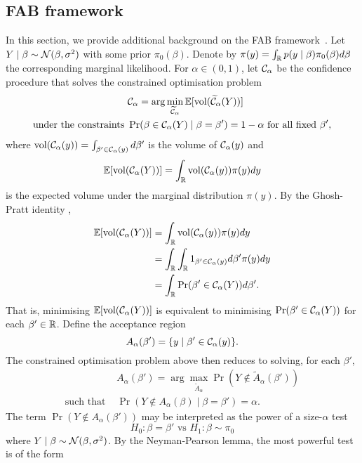 \subsection{FAB framework}
\label{sec:app:backgroundFAB}
In this section, we provide additional background on the FAB framework~\citep{Pratt1961,Pratt1963,Yu2018}.
Let $Y\mid \beta\sim\mathcal N(\beta,\sigma^2)$ with some prior $\pi_0(\beta)$. Denote by $\pi(y)=\int_\mathbb R p(y\mid \beta)\pi_0(\beta)d\beta$ the corresponding marginal likelihood.
For $\alpha\in(0,1)$, let $\mathcal C_\alpha$ be the confidence procedure that solves the constrained optimisation problem
\begin{align*}
    &\mathcal C_\alpha=\arg\min_{\widetilde {\mathcal C}_\alpha} \mathbb E[\mathrm{vol}(\widetilde{\mathcal C}_\alpha(Y))]\\
    \text{under the constraints }&\Pr(\beta\in \mathcal C_\alpha(Y)\mid \beta=\beta')=1-\alpha \text{ for all fixed }\beta',
\end{align*}
where $\mathrm{vol}(\mathcal C_\alpha(y))=\int_{\beta'\in\mathcal C_\alpha(y)}d\beta'$ is the volume of $\mathcal C_\alpha(y)$ and
\begin{equation}
    \mathbb E[\mathrm{vol}(\mathcal C_\alpha(Y))] = \int_{\mathbb R} \mathrm{vol}(\mathcal C_\alpha(y))\pi(y)dy
\end{equation}
is the expected volume under the marginal distribution $\pi(y)$. By the Ghosh-Pratt identity \citep{Ghosh1961,Pratt1961},
\begin{align*}
    \mathbb E[\mathrm{vol}(\mathcal C_\alpha(Y))] &= \int_\mathbb R \mathrm{vol}(\mathcal C_\alpha(y))\pi(y)dy\\
    &=\int_\mathbb R \int_\mathbb R 1_{\beta'\in \mathcal C_\alpha(y)} d\beta'\pi(y)dy\\
    &=\int_\mathbb R \Pr(\beta'\in \mathcal C_\alpha(Y))d\beta'.
\end{align*}
That is, minimising $\mathbb E[\mathrm{vol}(\mathcal C_\alpha(Y))]$ is equivalent to minimising $\Pr(\beta'\in \mathcal C_\alpha(Y))$ for each $\beta'\in\mathbb R$. Define the acceptance region 
$$
    A_\alpha(\beta')=\{y\mid \beta'\in \mathcal C_\alpha(y)\}.
$$
The constrained optimisation problem above then reduces to solving, for each $\beta'$,
\begin{align*}
    &A_\alpha(\beta')=\arg\max_{\widetilde A_\alpha} \Pr(Y \notin \widetilde A_\alpha(\beta')) \\
    \text{such that }&\Pr(Y\notin A_\alpha(\beta)\mid \beta=\beta')=\alpha.
\end{align*}
The term $\Pr(Y \notin  A_\alpha(\beta'))$ may be interpreted as the power of a size-$\alpha$ test 
$$
    H_0:\beta=\beta'\text{ vs }H_1:\beta\sim\pi_0
$$
where $Y\mid \beta\sim\mathcal N(\beta,\sigma^2)$. By the Neyman-Pearson lemma, the most powerful test is of the form
